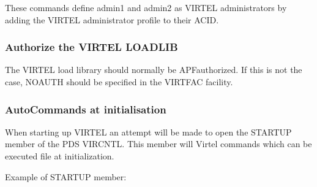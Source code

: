 \documentclass[letterpaper,10pt,english]{sphinxmanual}
\begin{document}
\sphinxAtStartPar
{}

\sphinxAtStartPar
These commands define admin1 and admin2 as VIRTEL administrators by adding the VIRTEL administrator profile to their ACID.

\ignorespaces 

\subsubsection{Authorize the VIRTEL LOADLIB}
\label{\detokenize{Installation_Guide:authorize-the-virtel-loadlib}}\label{\detokenize{Installation_Guide:index-188}}
\sphinxAtStartPar
The VIRTEL load library should normally be APF\sphinxhyphen{}authorized. If this is not the case, NOAUTH should be specified in the VIRTFAC facility.

\ignorespaces 

\subsubsection{AutoCommands at initialisation}
\label{\detokenize{Installation_Guide:autocommands-at-initialisation}}\label{\detokenize{Installation_Guide:index-189}}
\sphinxAtStartPar
When starting up VIRTEL an attempt will be made to open the STARTUP member of the PDS VIRCNTL. This member will Virtel commands which can be executed file at initialization.

\sphinxAtStartPar
Example of STARTUP member: \sphinxhyphen{}

\begin{sphinxVerbatim}[commandchars=\\\{\}]
    
   
   
    
       
   
   
   
\end{sphinxVerbatim}
\end{document}
